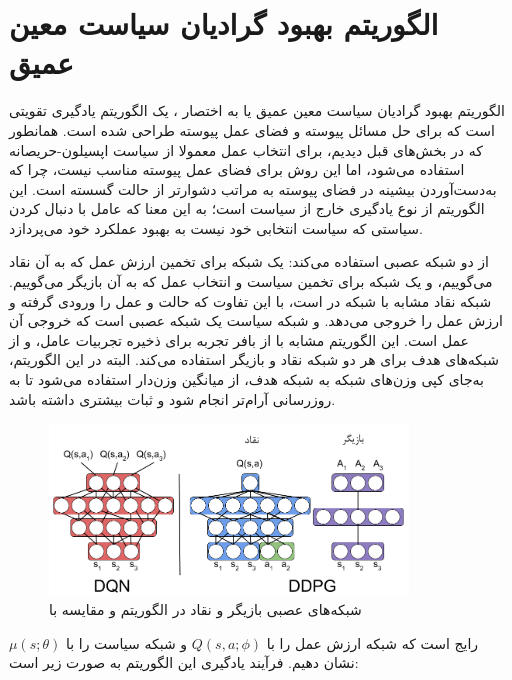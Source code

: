 \section{الگوریتم بهبود گرادیان سیاست معین عمیق}
الگوریتم بهبود گرادیان سیاست معین عمیق  یا به اختصار ، یک الگوریتم یادگیری تقویتی است که برای حل مسائل پیوسته و فضای عمل پیوسته طراحی شده است.
همانطور که در بخش‌های قبل دیدیم، برای انتخاب عمل معمولا از سیاست اپسیلون-حریصانه استفاده می‌شود، اما این روش برای فضای عمل پیوسته مناسب نیست، چرا که به‌دست‌آوردن بیشینه در فضای پیوسته به مراتب دشوار‌تر از حالت گسسته است.
این الگوریتم از نوع یادگیری خارج از سیاست است؛ به این معنا که عامل با دنبال کردن سیاستی که سیاست انتخابی خود نیست به بهبود عملکرد خود می‌پردازد.

از دو شبکه عصبی استفاده می‌کند: یک شبکه برای تخمین ارزش عمل که به آن نقاد می‌گوییم، و یک شبکه برای تخمین سیاست و انتخاب عمل که به آن بازیگر می‌گوییم.
شبکه نقاد مشابه با شبکه
  در 
   است، با این تفاوت که حالت و عمل را ورودی گرفته و ارزش عمل را خروجی می‌دهد.
 و شبکه سیاست یک شبکه عصبی است که خروجی آن عمل است.
 این الگوریتم مشابه با 
 از بافر تجربه برای ذخیره تجربیات عامل، و از شبکه‌های هدف برای هر دو شبکه نقاد و بازیگر استفاده می‌کند.
 البته در این الگوریتم، به‌جای کپی وزن‌های شبکه به شبکه هدف، از میانگین وزن‌دار استفاده می‌شود تا به روز‌رسانی آرام‌تر انجام شود و ثبات بیشتری داشته باشد.
 \begin{figure}[H]
    \centering
    \includegraphics[width=0.85\textwidth]{images/actor_critic.png}
    \caption{شبکه‌های عصبی بازیگر و نقاد در الگوریتم  و مقایسه با }\label{fig:actor_critic}
\end{figure}
رایج است که شبکه ارزش عمل را با $Q(s, a; \phi)$ و شبکه سیاست را با $\mu(s; \theta)$ نشان دهیم.
فرآیند یادگیری این الگوریتم به صورت زیر است:
